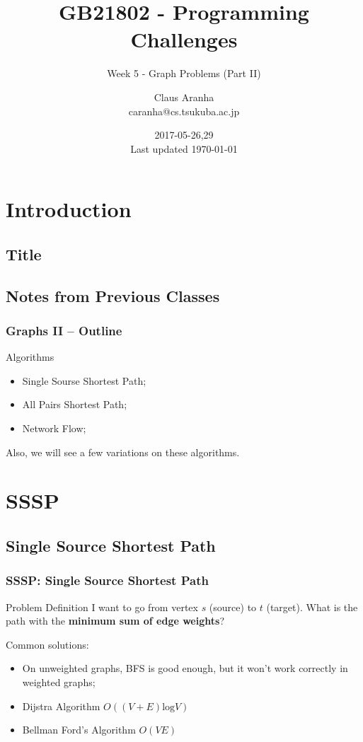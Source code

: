 \documentclass{beamer}
\title[GB21802]{GB21802 - Programming Challenges}
\subtitle[]{Week 5 - Graph Problems (Part II)}
\author[Claus Aranha]{Claus Aranha\\{\footnotesize caranha@cs.tsukuba.ac.jp}}
\institute{College of Information Science}
\date{2017-05-26,29\\{\tiny Last updated \today}}
\begin{document}
\section{Introduction}
\subsection{Title}
\begin{frame}
\maketitle
\end{frame}

\subsection{Notes from Previous Classes}



\begin{frame}
  \frametitle{Graphs II -- Outline}
  \begin{block}{Algorithms}
    \begin{itemize}
    \item Single Sourse Shortest Path;
    \item All Pairs Shortest Path;
    \item Network Flow;
    \end{itemize}
  \end{block}

  \bigskip

  Also, we will see a few variations on these algorithms.
\end{frame}

\section{SSSP}

\subsection{Single Source Shortest Path}
\begin{frame}
  \frametitle{SSSP: Single Source Shortest Path}
  \begin{block}{Problem Definition}
    I want to go from vertex $s$ (source) to $t$ (target). What is
    the path with the {\bf minimum sum of edge weights}?
  \end{block}
  
  \bigskip
  
  {\smaller
    Common solutions:
    
    \begin{itemize}
    \item On \alert{unweighted} graphs, BFS is good enough, but it
      won't work correctly in weighted graphs;
    \item Dijstra Algorithm $O((V+E)\text{log}V)$
    \item Bellman Ford's Algorithm $O(VE)$
    \end{itemize}
  }
\end{frame}
\end{document}
